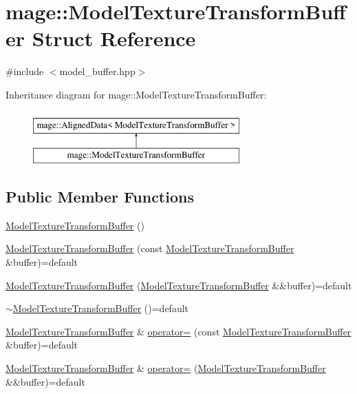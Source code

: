 \hypertarget{structmage_1_1_model_texture_transform_buffer}{}\section{mage\+:\+:Model\+Texture\+Transform\+Buffer Struct Reference}
\label{structmage_1_1_model_texture_transform_buffer}


{\ttfamily \#include $<$model\+\_\+buffer.\+hpp$>$}

Inheritance diagram for mage\+:\+:Model\+Texture\+Transform\+Buffer\+:\begin{figure}[H]
\begin{center}
\leavevmode
\includegraphics[height=2.000000cm]{structmage_1_1_model_texture_transform_buffer}
\end{center}
\end{figure}
\subsection*{Public Member Functions}
\begin{DoxyCompactItemize}
\item 
\hyperlink{structmage_1_1_model_texture_transform_buffer_a500d8232f1350b0beccc2181951309d6}{Model\+Texture\+Transform\+Buffer} ()
\item 
\hyperlink{structmage_1_1_model_texture_transform_buffer_a5b0c7030b2e48302e6c071935a4bc7d5}{Model\+Texture\+Transform\+Buffer} (const \hyperlink{structmage_1_1_model_texture_transform_buffer}{Model\+Texture\+Transform\+Buffer} \&buffer)=default
\item 
\hyperlink{structmage_1_1_model_texture_transform_buffer_a35516b344752486fa40cd14b59e17ec9}{Model\+Texture\+Transform\+Buffer} (\hyperlink{structmage_1_1_model_texture_transform_buffer}{Model\+Texture\+Transform\+Buffer} \&\&buffer)=default
\item 
\hyperlink{structmage_1_1_model_texture_transform_buffer_a855c8ccaefe9bac3fd10cdc143616cd9}{$\sim$\+Model\+Texture\+Transform\+Buffer} ()=default
\item 
\hyperlink{structmage_1_1_model_texture_transform_buffer}{Model\+Texture\+Transform\+Buffer} \& \hyperlink{structmage_1_1_model_texture_transform_buffer_a4fd72713afb7e68208c0356a2b55f3d9}{operator=} (const \hyperlink{structmage_1_1_model_texture_transform_buffer}{Model\+Texture\+Transform\+Buffer} \&buffer)=default
\item 
\hyperlink{structmage_1_1_model_texture_transform_buffer}{Model\+Texture\+Transform\+Buffer} \& \hyperlink{structmage_1_1_model_texture_transform_buffer_a025ad62973c7ae20b8e977f94c509a54}{operator=} (\hyperlink{structmage_1_1_model_texture_transform_buffer}{Model\+Texture\+Transform\+Buffer} \&\&buffer)=default
\end{DoxyCompactItemize}
